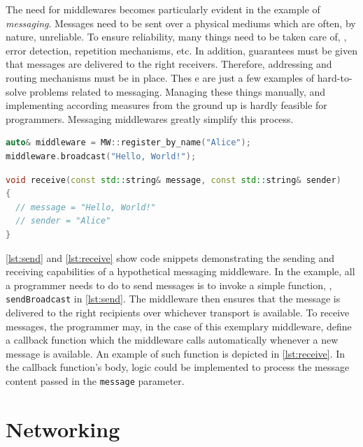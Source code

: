 The need for middlewares becomes particularly evident in the example of \emph{messaging}. Messages need to be sent over a physical mediums which are often, by nature, unreliable. To ensure reliability, many things need to be taken care of, \eg , error detection, repetition mechanisms, etc. In addition, guarantees must be given that messages are delivered to the right receivers. Therefore, addressing and routing mechanisms must be in place. Thes
e are just a few examples of hard-to-solve problems related to messaging. Managing these things manually, and implementing according measures from the ground up is hardly feasible for programmers. Messaging middlewares greatly simplify this process. 
\begin{lstlisting}[title={Middleware send example}, caption={An exemplary code snippet demonstrating a broadcast dispatch via middleware}, label={lst:send}, language={C++}]
auto& middleware = MW::register_by_name("Alice");
middleware.broadcast("Hello, World!");
\end{lstlisting}
\begin{lstlisting}[title={Middleware receive example}, caption={An exemplary callback function to receive messages via middleware}, label={lst:receive}, language={C++}]
void receive(const std::string& message, const std::string& sender) 
{ 
  // message = "Hello, World!"
  // sender = "Alice"    
}
\end{lstlisting}
\autoref{lst:send} and \autoref{lst:receive} show code snippets demonstrating the sending and receiving capabilities of a hypothetical messaging middleware. In the example, all a programmer needs to do to send messages is to invoke a simple function, \eg , \texttt{sendBroadcast} in \autoref{lst:send}. The middleware then ensures that the message is delivered to the right recipients over whichever transport is available. To receive messages, the programmer may, in the case of this exemplary middleware, define a callback function which the middleware calls automatically whenever a new message is available. An example of such function is depicted in \autoref{lst:receive}. In the callback function's body, logic could be implemented to process the message content passed in the \texttt{message} parameter.

%
%
%
%
%
%
%
%
%
%

\section{Networking}

